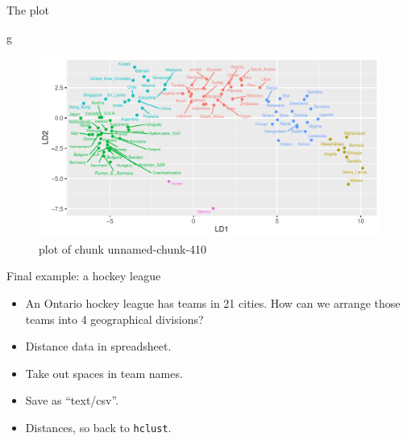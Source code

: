 \documentclass[ignorenonframetext,]{beamer}
\newenvironment{Shaded}{\begin{snugshade}}{\end{snugshade}}
\newcommand{\NormalTok}[1]{#1}
\begin{document}
\begin{frame}[fragile]{The plot}
\protect\hypertarget{the-plot-7}{}

\begin{Shaded}
\begin{Highlighting}[]
\NormalTok{g}
\end{Highlighting}
\end{Shaded}

\begin{figure}
\centering
\includegraphics{figure/unnamed-chunk-410-1.pdf}
\caption{plot of chunk unnamed-chunk-410}
\end{figure}

\end{frame}

\begin{frame}[fragile]{Final example: a hockey league}
\protect\hypertarget{final-example-a-hockey-league}{}

\begin{itemize}
\item
  An Ontario hockey league has teams in 21 cities. How can we arrange
  those teams into 4 geographical divisions?
\item
  Distance data in spreadsheet.
\item
  Take out spaces in team names.
\item
  Save as ``text/csv''.
\item
  Distances, so back to \texttt{hclust}.
\end{itemize}

\end{frame}
\end{document}
